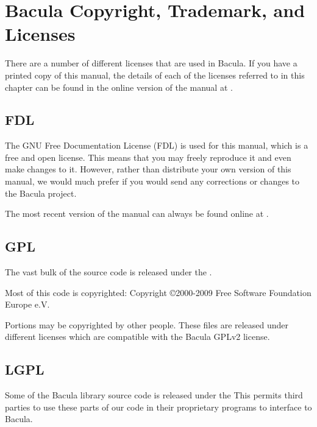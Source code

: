 
\chapter{Bacula Copyright, Trademark, and Licenses}
\label{LicenseChapter}

There are a number of different licenses that are used in Bacula. 
If you have a printed copy of this manual, the details of each of
the licenses referred to in this chapter can be found in the
online version of the manual at
.

\section{FDL}

The GNU Free Documentation License (FDL) is used for this manual,
which is a free and open license. This means that you may freely   
reproduce it and even make changes to it. However, rather than
distribute your own version of this manual, we would much prefer
if you would send any corrections or changes to the Bacula project.
 
The most recent version of the manual can always be found online
at .

\section{GPL}

The vast bulk of the source code is released under the 
.

Most of this code is copyrighted: Copyright \copyright 2000-2009
Free Software Foundation Europe e.V.

Portions may be copyrighted by other people.  These files are released
under different licenses which are compatible with the Bacula GPLv2 license.

\section{LGPL}

Some of the Bacula library source code is released under the 
 This
permits third parties to use these parts of our code in their proprietary
programs to interface to Bacula. 


